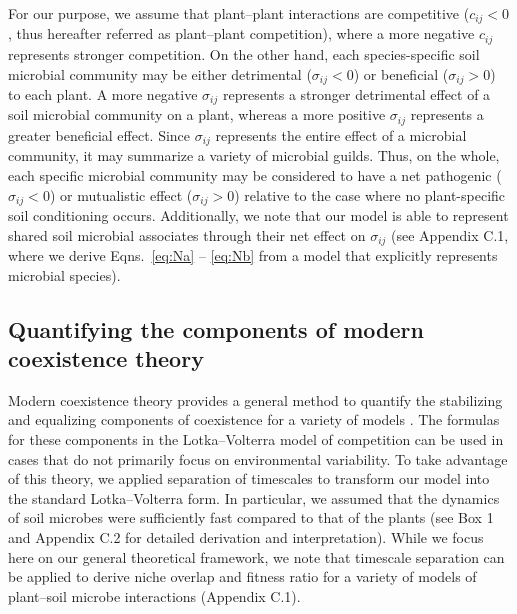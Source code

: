 \noindent For our purpose, we assume that plant--plant interactions are competitive ($c_{ij} < 0$, thus hereafter referred as plant--plant competition), where a more negative $c_{ij}$ represents stronger competition.
On the other hand, each species-specific soil microbial community may be either detrimental ($\sigma_{ij} < 0$) or beneficial ($\sigma_{ij} > 0$) to each plant.
A more negative $\sigma_{ij}$ represents a stronger detrimental effect of a soil microbial community on a plant, whereas a more positive $\sigma_{ij}$ represents a greater beneficial effect.
Since $\sigma_{ij}$ represents the entire effect of a microbial community, it may summarize a variety of microbial guilds. Thus, on the whole, each specific microbial community may be considered to have a net pathogenic ($\sigma_{ij} < 0$) or mutualistic effect ($\sigma_{ij} > 0$) relative to the case where no plant-specific soil conditioning occurs.
Additionally, we note that our model is able to represent shared soil microbial associates through their net effect on $\sigma_{ij}$ (see Appendix C.1, where we derive Eqns.~\ref{eq:Na} -- \ref{eq:Nb} from a model that explicitly represents microbial species).
\par



\subsection{Quantifying the components of modern coexistence theory}
Modern coexistence theory provides a general method to quantify the stabilizing and equalizing components of coexistence for a variety of models \citep{Chesson2003, Barabas2018}.
The formulas for these components in the Lotka--Volterra model of competition \citep{Chesson1990, Chesson2008b, Chesson2013ecosys} can be used in cases that do not primarily focus on environmental variability.
To take advantage of this theory, we applied separation of timescales to transform our model into the standard Lotka--Volterra form. In particular, we assumed that the dynamics of soil microbes were sufficiently fast compared to that of the plants (see Box 1 and Appendix C.2 for detailed derivation and interpretation). While we focus here on our general theoretical framework, we note that timescale separation can be applied to derive niche overlap and fitness ratio for a variety of models of plant--soil microbe interactions (Appendix C.1).
\par


